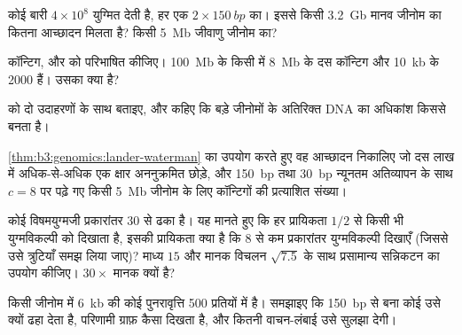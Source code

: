\begin{exercise}[$\star$]\label{exo:b3:genomics:2}
कोई बारी $4\times 10^{8}$ युग्मित  देती है, हर एक $2\times \qty{150}{bp}$ का।
इससे किसी \qty{3.2}{Gb} मानव जीनोम का कितना आच्छादन मिलता है? किसी
\qty{5}{Mb} जीवाणु जीनोम का?
\end{exercise}

\begin{exercise}[$\star$]\label{exo:b3:genomics:3}
कॉन्टिग,  और  को परिभाषित कीजिए। \qty{100}{Mb} के किसी
 में \qty{8}{Mb} के दस कॉन्टिग और \qty{10}{kb} के \num{2000} हैं।
उसका  क्या है?
\end{exercise}

\begin{exercise}[$\star$]\label{exo:b3:genomics:4}
 को दो उदाहरणों के साथ बताइए, और कहिए कि बड़े जीनोमों के
अतिरिक्त DNA का अधिकांश किससे बनता है।
\end{exercise}

\begin{exercise}[$\star\star$]\label{exo:b3:genomics:5}
\cref{thm:b3:genomics:lander-waterman} का उपयोग करते हुए वह आच्छादन
निकालिए जो दस लाख में अधिक-से-अधिक एक क्षार अननुक्रमित छोड़े, और
\qty{150}{bp}  तथा \qty{30}{bp} न्यूनतम अतिव्यापन के साथ $c = 8$
पर पढ़े गए किसी \qty{5}{Mb} जीनोम के लिए कॉन्टिगों की प्रत्याशित संख्या।
\end{exercise}

\begin{exercise}[$\star\star$]\label{exo:b3:genomics:6}
कोई विषमयुग्मजी प्रकारांतर $30$  से ढका है। यह मानते हुए कि हर
 प्रायिकता $1/2$ से किसी भी युग्मविकल्पी को दिखाता है, इसकी
प्रायिकता क्या है कि $8$ से कम  प्रकारांतर युग्मविकल्पी दिखाएँ
(जिससे उसे त्रुटियाँ समझ लिया जाए)? माध्य $15$ और मानक विचलन
$\sqrt{7.5}$ के साथ प्रसामान्य सन्निकटन का उपयोग कीजिए। $30\times$ मानक
क्यों है?
\end{exercise}

\begin{exercise}[$\star\star$]\label{exo:b3:genomics:7}
किसी जीनोम में \qty{6}{kb} की कोई पुनरावृत्ति \num{500} प्रतियों में
है। समझाइए कि \qty{150}{bp}  से बना कोई  उसे क्यों ढहा
देता है, परिणामी ग्राफ़ कैसा दिखता है, और कितनी वाचन-लंबाई उसे सुलझा देगी।
\end{exercise}

